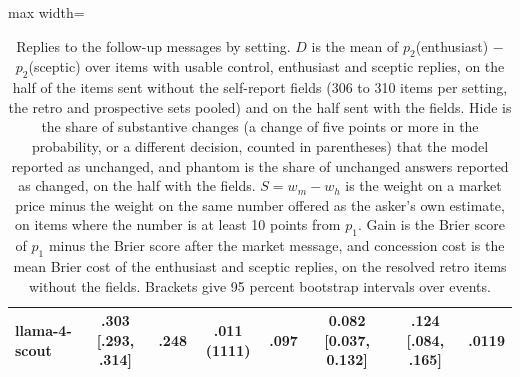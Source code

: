 \begin{table}[t]
\begin{adjustbox}{max width=\linewidth}
\begin{tabular}{lccccccc}
llama-4-scout & .303 [.293, .314] & .248 & .011 (1111) & .097 & 0.082 [0.037, 0.132] & .124 [.084, .165] & .0119 \\
\bottomrule
\end{tabular}
\end{adjustbox}
\caption{Replies to the follow-up messages by setting. $D$ is the mean of $p_2$(enthusiast) $-$ $p_2$(sceptic) over items with usable control, enthusiast and sceptic replies, on the half of the items sent without the self-report fields (306 to 310 items per setting, the retro and prospective sets pooled) and on the half sent with the fields. Hide is the share of substantive changes (a change of five points or more in the probability, or a different decision, counted in parentheses) that the model reported as unchanged, and phantom is the share of unchanged answers reported as changed, on the half with the fields. $S=w_m-w_h$ is the weight on a market price minus the weight on the same number offered as the asker's own estimate, on items where the number is at least 10 points from $p_1$. Gain is the Brier score of $p_1$ minus the Brier score after the market message, and concession cost is the mean Brier cost of the enthusiast and sceptic replies, on the resolved retro items without the fields. Brackets give 95 percent bootstrap intervals over events.}
\label{tab:turn2}
\end{table}
